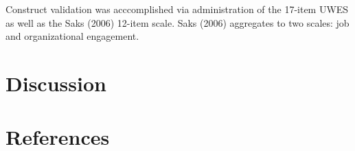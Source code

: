 \documentclass[
  english,
  man]{apa6}
\begin{document}
Construct validation was acccomplished via administration of the 17-item UWES as well as the Saks (2006) 12-item scale. Saks (2006) aggregates to two scales: job and organizational engagement.

\hypertarget{discussion}{%
\section{Discussion}\label{discussion}}

\newpage

\hypertarget{references}{%
\section{References}\label{references}}

\begingroup
\setlength{\parindent}{-0.5in}
\setlength{\leftskip}{0.5in}
\end{document}

